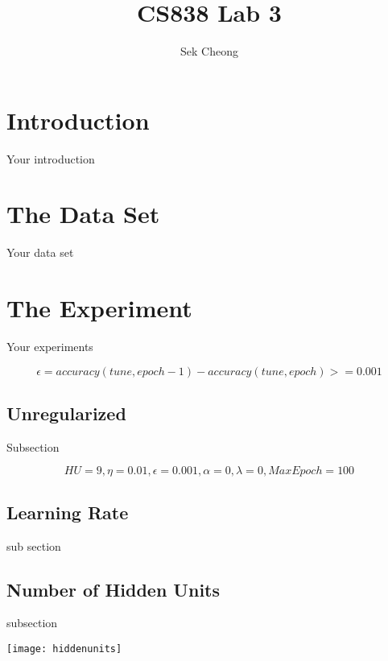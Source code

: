 \documentclass{article}
\begin{document}
\title{CS838 Lab 3}
\author{Sek Cheong}
\maketitle


\section{Introduction}
Your introduction

\section{The Data Set}
Your data set

\section{The Experiment}
Your experiments

\begin{equation}
\epsilon = accuracy(tune,epoch-1) - accuracy(tune, epoch) >= 0.001
\end{equation}



\subsection{Unregularized}
Subsection

\begin{equation*}
HU=9, \eta=0.01, \epsilon=0.001, \alpha=0, \lambda=0, MaxEpoch=100
\end{equation*}



\subsection{Learning Rate}

sub section



\subsection{Number of Hidden Units}

subsection
\begin{center}
 \texttt{[image: hiddenunits]}
\end{center}
\end{document}
